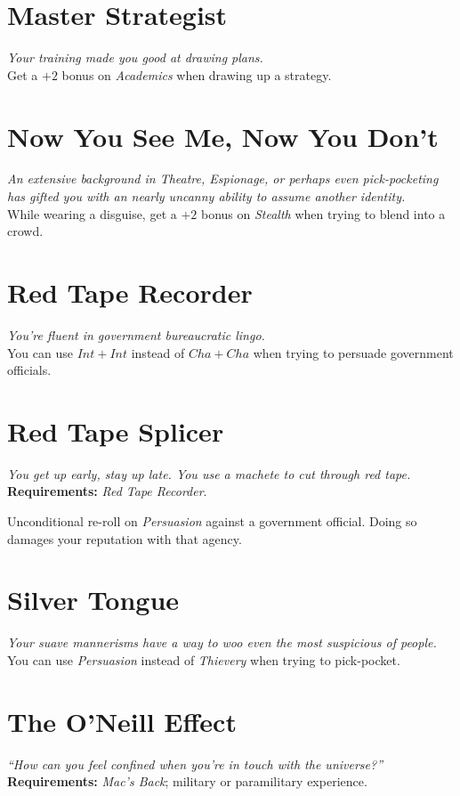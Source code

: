 \section{Master Strategist}
\textit{Your training made you good at drawing plans.}\\
Get a $+2$ bonus on \textit{Academics} when drawing up a strategy.

\section{Now You See Me, Now You Don't}
\textit{An extensive background in Theatre, Espionage, or perhaps even pick-pocketing has gifted you with an nearly uncanny ability to assume another identity.}\\
While wearing a disguise, get a $+2$ bonus on \textit{Stealth} when trying to blend into a crowd.

\section{Red Tape Recorder}
\textit{You're fluent in government bureaucratic lingo.}\\ 
You can use $Int + Int$ instead of $Cha + Cha$ when trying to persuade government officials.

\section{Red Tape Splicer}
\textit{You get up early, stay up late. You use a machete to cut through red tape.}\\
\textbf{Requirements:} \textit{Red Tape Recorder}.

Unconditional re-roll on \textit{Persuasion} against a government official.
Doing so damages your reputation with that agency.

\section{Silver Tongue}
\textit{Your suave mannerisms have a way to woo even the most suspicious of people.}\\
You can use \textit{Persuasion} instead of \textit{Thievery} when trying to pick-pocket.

\section{The O'Neill Effect}
\textit{``How can you feel confined when you're in touch with the universe?''}\\
\textbf{Requirements:} \textit{Mac's Back}; military or paramilitary experience. 

